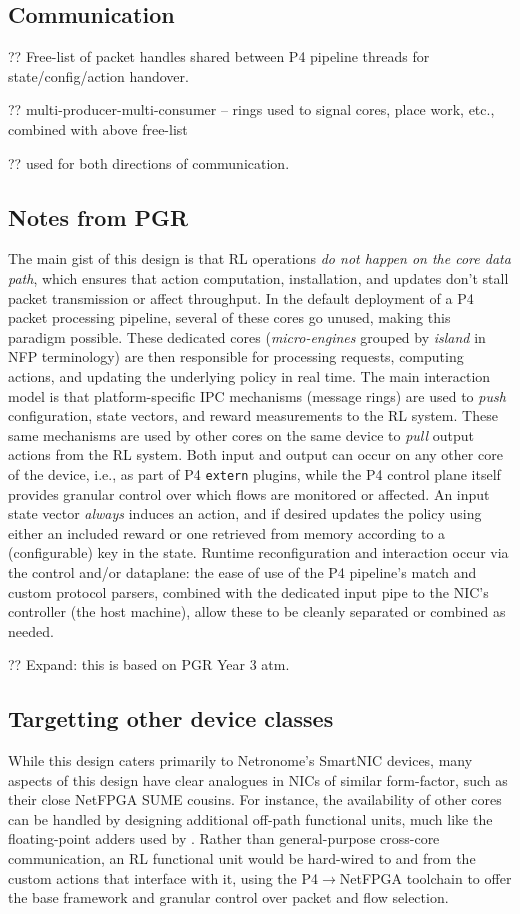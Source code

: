 \documentclass[sigconf,natbib=false]{acmart}
\begin{document}
\subsection{Communication}
?? Free-list of packet handles shared between P4 pipeline threads for state/config/action handover.

?? multi-producer-multi-consumer -- rings used to signal cores, place work, etc., combined with above free-list

?? used for both directions of communication.

\subsection{Notes from PGR}

The main gist of this design is that RL operations \emph{do not happen on the core data path}, which ensures that action computation, installation, and updates don't stall packet transmission or affect throughput.
In the default deployment of a P4 packet processing pipeline, several of these cores go unused, making this paradigm possible.
These dedicated cores (\emph{micro-engines} grouped by \emph{island} in NFP terminology) are then responsible for processing requests, computing actions, and updating the underlying policy in real time.
The main interaction model is that platform-specific IPC mechanisms (message rings) are used to \emph{push} configuration, state vectors, and reward measurements to the RL system.
These same mechanisms are used by other cores on the same device to \emph{pull} output actions from the RL system.
Both input and output can occur on any other core of the device, i.e., as part of P4 \texttt{extern} plugins, while the P4 control plane itself provides granular control over which flows are monitored or affected.
An input state vector \emph{always} induces an action, and if desired updates the policy using either an included reward or one retrieved from memory according to a (configurable) key in the state.
Runtime reconfiguration and interaction occur via the control and/or dataplane: the ease of use of the P4 pipeline's match and custom protocol parsers, combined with the dedicated input pipe to the NIC's controller (the host machine), allow these to be cleanly separated or combined as needed.

?? Expand: this is based on PGR Year 3 atm.

\subsection{Targetting other device classes}
While this design caters primarily to Netronome's SmartNIC devices, many aspects of this design have clear analogues in NICs of similar form-factor, such as their close NetFPGA SUME cousins.
For instance, the availability of other cores can be handled by designing additional off-path functional units, much like the floating-point adders used by \textcite{DBLP:conf/isca/LiLYCSH19}.
Rather than general-purpose cross-core communication, an RL functional unit would be hard-wired to and from the custom actions that interface with it, using the P4$\rightarrow$NetFPGA toolchain to offer the base framework and granular control over packet and flow selection.
\end{document}
